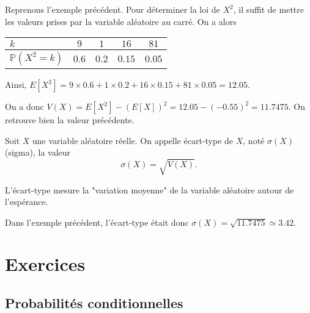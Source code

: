 \documentclass[11pt,fleqn, openany]{book} %
\begin{document}
\begin{example}
Reprenons l'exemple précédent. Pour déterminer la loi de $X^2$, il suffit de mettre les valeurs prises par la variable aléatoire au carré. On a alors

\renewcommand{\arraystretch}{2.2}
\begin{center}
\begin{tabular}{|l|c|c|c|c|}
\hline
$k$ & $9$& $1$ & $16$ & $81$ \\
\hline
$\mathbb{P}(X^2=k)$ & $0.6$ & $0.2$ & $0.15$ & $0.05$\\
\hline \end{tabular}
\end{center}

Ainsi, $E[X^2]=9 \times 0.6 +1 \times 0.2+16 \times 0.15+81 \times 0.05=12.05$.

On a donc $V(X)=E[X^2]-(E[X])^2=12.05-(-0.55)^2=11.7475$. On retrouve bien la valeur précédente.

\end{example}

\begin{definition} Soit $X$ une variable aléatoire réelle. On appelle écart-type de $X$, noté $\sigma(X)$ (sigma), la valeur
\[ \sigma (X)= \sqrt{V(X)}.\]\end{definition}

L'écart-type mesure la "variation moyenne" de la variable aléatoire autour de l'espérance.

\begin{example}Dans l'exemple précédent, l'écart-type était donc $\sigma(X)=\sqrt{11.7475}\simeq 3.42$.\end{example}

\chapter{Exercices}

\section*{Probabilités conditionnelles}
\end{document}
